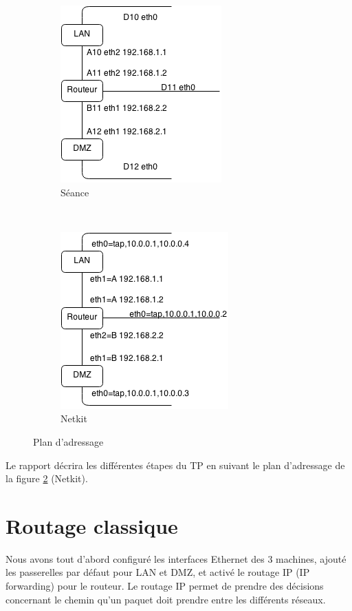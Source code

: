 \documentclass[frenchb, 11pt]{article}
\begin{document}
\begin{figure}[h!]
	\centering
	\begin{subfigure}[b]{0.4\textwidth}
		\includegraphics[scale=0.80]{sch1.png}
		\caption{Séance}
	\end{subfigure}%
	~
	\begin{subfigure}[b]{0.4\textwidth}
	\includegraphics[scale=0.80]{sch2.png}
	\caption{Netkit}
	\label{fig:planadrnetkit}
	\end{subfigure}
	\caption{Plan d'adressage}
\end{figure}

\begin{mdframed}[backgroundcolor=lightred, linecolor=darkred]
Le rapport décrira les différentes étapes du TP en suivant le plan d'adressage de la figure \ref{fig:planadrnetkit} (Netkit).
\end{mdframed}


\newpage

\section{Routage classique}
Nous avons tout d'abord configuré les interfaces Ethernet des 3 machines, ajouté les passerelles par défaut pour LAN et DMZ, et activé le routage IP (IP forwarding) pour le routeur. Le routage IP permet de prendre des décisions concernant le chemin qu'un paquet doit prendre entre les différents réseaux.
\end{document}
